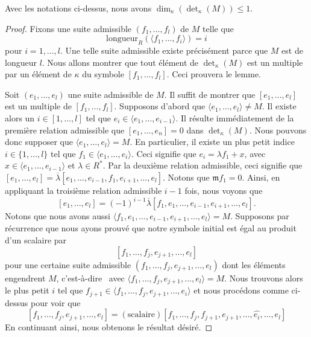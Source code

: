 \begin{lemma}
\label{lemma-dimension-at-most-one}
Avec les notations ci-dessus, nous avons $\dim_\kappa(\det_\kappa(M)) \leq 1$.
\end{lemma}

\begin{proof}
Fixons une suite admissible $(f_1, \ldots, f_l)$ de $M$ telle que
$$
\text{longueur}_R(\langle f_1, \ldots, f_i\rangle) = i
$$
pour $i = 1, \ldots, l$. Une telle suite admissible existe précisément parce que
$M$ est de longueur $l$. Nous allons montrer que tout élément de
$\det_\kappa(M)$ est un multiple par un élément de $\kappa$ du symbole
$[f_1, \ldots, f_l]$. Ceci prouvera le lemme.

\medskip\noindent
Soit $(e_1, \ldots, e_l)$ une suite admissible de $M$.
Il suffit de montrer que $[e_1, \ldots, e_l]$ est un multiple
de $[f_1, \ldots, f_l]$. Supposons d'abord que
$\langle e_1, \ldots, e_l\rangle \not = M$. Il existe alors
un $i \in [1, \ldots, l]$ tel que
$e_i \in \langle e_1, \ldots, e_{i - 1}\rangle$. Il résulte immédiatement
de la première relation admissible que
$[e_1, \ldots, e_n] = 0$ dans $\det_\kappa(M)$.
Nous pouvons donc supposer que $\langle e_1, \ldots, e_l\rangle = M$.
En particulier, il existe un plus petit indice $i \in \{1, \ldots, l\}$
tel que $f_1 \in \langle e_1, \ldots, e_i\rangle$. Ceci signifie
que $e_i = \lambda f_1 + x$, avec
$x \in \langle e_1, \ldots, e_{i - 1}\rangle$ et $\lambda \in R^*$.
Par la deuxième relation admissible, ceci signifie que
$[e_1, \ldots, e_l] =
\overline{\lambda}[e_1, \ldots, e_{i - 1}, f_1, e_{i + 1}, \ldots, e_l]$.
Notons que $\mathfrak m f_1 = 0$. Ainsi, en appliquant la troisième
relation admissible $i - 1$ fois, nous voyons que
$$
[e_1, \ldots, e_l] =
(-1)^{i - 1}\overline{\lambda}
[f_1, e_1, \ldots, e_{i - 1}, e_{i + 1}, \ldots, e_l].
$$
Notons que nous avons aussi
$ \langle f_1, e_1, \ldots, e_{i - 1}, e_{i + 1}, \ldots, e_l\rangle = M$.
Supposons par récurrence que nous ayons prouvé que notre symbole
initial est égal au produit d'un scalaire par
$$
[f_1, \ldots, f_j, e_{j + 1}, \ldots, e_l]
$$
pour une certaine suite admissible $(f_1, \ldots, f_j, e_{j + 1}, \ldots, e_l)$
dont les éléments engendrent $M$, c'est-à-dire \ avec
$\langle f_1, \ldots, f_j, e_{j + 1}, \ldots, e_l\rangle = M$.
Nous trouvons alors le plus petit $i$ tel que
$f_{j + 1} \in \langle f_1, \ldots, f_j, e_{j + 1}, \ldots, e_i\rangle$
et nous procédons comme ci-dessus pour voir que
$$
[f_1, \ldots, f_j, e_{j + 1}, \ldots, e_l]
=
(\text{scalaire}) [f_1, \ldots, f_j, f_{j + 1}, e_{j + 1},
\ldots, \hat{e_i}, \ldots, e_l]
$$
En continuant ainsi, nous obtenons le résultat désiré.
\end{proof}

